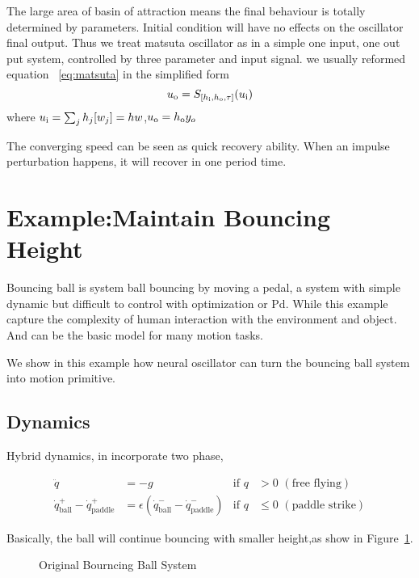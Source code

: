 The large area of basin of attraction means the final behaviour is totally determined by parameters. 
Initial condition will have no effects on the oscillator final output. 
Thus we treat matsuta oscillator as in a simple one input, one out put system, controlled by three parameter and input signal. 
we usually reformed equation ~\ref{eq:matsuta} in the simplified form
\begin{equation}
\label{eq:simplematsuta}
u_{\mathrm{o}}=S_{[h_{\mathrm{i}},h_{\mathrm{o}},\tau]}(u_{\mathrm{i}})
\end{equation}
where $u_{\mathrm{i}}=\sum_{j}h_{j}[w_{j}]=hw$,$u_{\mathrm{o}}=h_{\mathrm{o}} y_{o}$





The converging speed can be seen as quick recovery ability.
When an impulse perturbation happens, it will recover in one period time.


\section{Example:Maintain Bouncing Height}

Bouncing ball is system ball bouncing by moving a pedal, a system with simple dynamic but difficult to control with optimization or Pd. 
While this example capture the complexity of human interaction with the environment and object. 
And can be the basic model for many motion tasks.

We show in this example how neural oscillator can turn the bouncing ball system into motion primitive.
\subsection*{Dynamics}
Hybrid dynamics, in incorporate two phase, 
 

\begin{align}
\ddot{q}&=-g&\mathrm{if}\,\,q &> 0\,\,\mathrm{(free\,\,flying)} \nonumber\\
\dot{q}^{+}_{\mathrm{ball}} - \dot{q}^{+}_{\mathrm{paddle}} &=  \epsilon(\dot{q}^{-}_{\mathrm{ball}} - \dot{q}^{-}_{\mathrm{paddle}})&\mathrm{if}\,\,q &\leq 0\,\,\mathrm{(paddle\,\,strike)}\nonumber
\end{align}

Basically, the ball will continue bouncing with smaller height,as show in Figure~\ref{fig:bborg}.

\begin{figure}[h]
\begin{center}
	
\end{center}
\caption{Original Bourncing Ball System}
\label{fig:bborg}
\end{figure}



